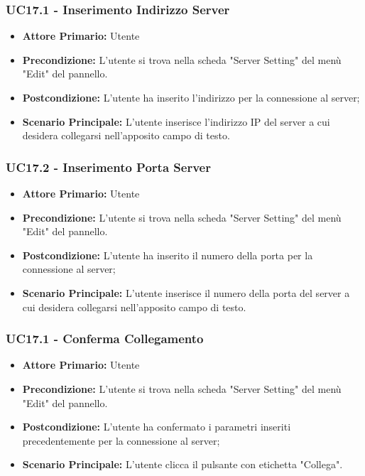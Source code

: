 \subsubsection{UC17.1 - Inserimento Indirizzo Server}\label{UC17.1}
\begin{itemize}
	\item \textbf{Attore Primario:}  Utente
	\item \textbf{Precondizione:} L'utente si trova nella scheda "Server Setting" del menù "Edit" del pannello.
	\item \textbf{Postcondizione:} L'utente ha inserito l'indirizzo per la connessione al server;
	\item \textbf{Scenario Principale:} L'utente inserisce l'indirizzo IP del server a cui desidera collegarsi nell'apposito campo di testo.
\end{itemize}

\subsubsection{UC17.2 - Inserimento Porta Server}\label{UC17.2}
\begin{itemize}
	\item \textbf{Attore Primario:}  Utente
	\item \textbf{Precondizione:} L'utente si trova nella scheda "Server Setting" del menù "Edit" del pannello.
	\item \textbf{Postcondizione:} L'utente ha inserito il numero della porta per la connessione al server;
	\item \textbf{Scenario Principale:} L'utente inserisce il numero della porta del server a cui desidera collegarsi nell'apposito campo di testo.
\end{itemize}

\subsubsection{UC17.1 - Conferma Collegamento}\label{UC17.3}
\begin{itemize}
	\item \textbf{Attore Primario:}  Utente
	\item \textbf{Precondizione:} L'utente si trova nella scheda "Server Setting" del menù "Edit" del pannello.
	\item \textbf{Postcondizione:} L'utente ha confermato i parametri inseriti precedentemente per la connessione al server;
	\item \textbf{Scenario Principale:} L'utente clicca il pulsante con etichetta "Collega".
\end{itemize}

